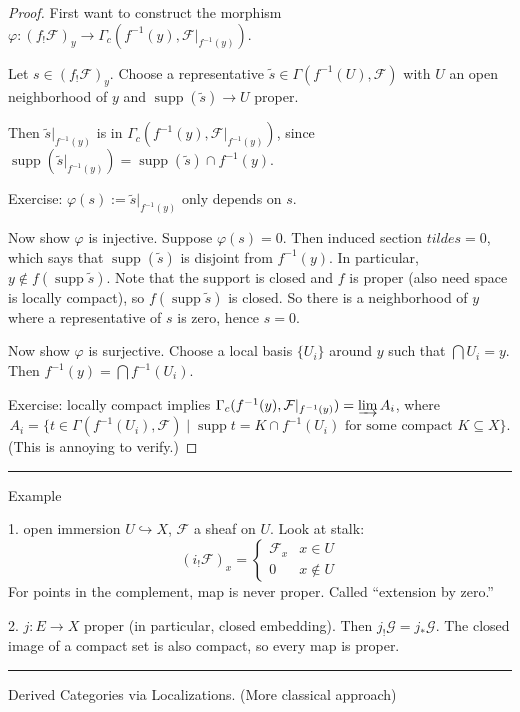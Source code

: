 \documentclass[12pt]{article}
\newcommand{\sepline}{\rule{\textwidth}{0.4pt}}
\theoremstyle{definition}
\newcommand{\FF}{\mathcal{F}}
\newcommand{\GG}{\mathcal{G}}
\renewcommand{\phi}{\varphi}
\newcommand{\<}{\left\langle}
\renewcommand{\>}{\right\rangle}
\newcommand{\seq}{\subseteq}
\newcommand{\inc}{\hookrightarrow}
\DeclareMathOperator{\supp}{supp}
\renewcommand{\_}[1]{{_{#1}}}
\begin{document}
\begin{proof}
    First want to construct the morphism $\phi : (f_!\FF)_y \to \Gamma_c(f^{-1}(y), \FF|_{f^{-1}(y)})$.

    Let $s \in (f_!\FF)_y$.
    Choose a representative $\tilde{s} \in \Gamma(f^{-1}(U), \FF)$ with $U$ an open neighborhood of $y$ and $\supp(\tilde{s}) \to U$ proper.

    Then $\tilde{s}|_{f^{-1}(y)}$ is in $\Gamma_c(f^{-1}(y), \FF|_{f^{-1}(y)})$, since $\supp(\tilde{s}|_{f^{-1}(y)}) = \supp(\tilde{s}) \cap f^{-1}(y)$.

    Exercise: $\phi(s) := \tilde{s}|_{f^{-1}(y)}$ only depends on $s$.

    Now show $\phi$ is injective.
    Suppose $\phi(s) = 0$.
    Then induced section $tilde{s} = 0$, which says that $\supp(\tilde{s})$ is disjoint from $f^{-1}(y)$.
    In particular, $y \notin f(\supp\tilde{s})$.
    Note that the support is closed and $f$ is proper (also need space is locally compact), so $f(\supp\tilde{s})$ is closed.
    So there is a neighborhood of $y$ where a representative of $s$ is zero, hence $s = 0$.

    Now show $\phi$ is surjective.
    Choose a local basis $\{U_i\}$ around $y$ such that $\bigcap U_i = y$.
    Then $f^{-1}(y) = \bigcap f^{-1}(U_i)$.

    Exercise: locally compact implies $\Gamma_c(f^{-1}(y), \FF|_{f^{-1}(y)}) = \varinjlim A_i$, where
    \[
        A_i = \{t \in \Gamma(f^{-1}(U_i), \FF) \mid \supp t = K \cap f^{-1}(U_i) \text{ for some compact } K \seq X\}.
    \]
    (This is annoying to verify.)

    
\end{proof}

\sepline

Example

1. open immersion $U \inc X$, $\FF$ a sheaf on $U$.
Look at stalk:
\[
    (i_!\FF)_x = \begin{cases}
        \FF_x & x \in U \\
        0 & x \notin U
    \end{cases}
\]
For points in the complement, map is never proper.
Called ``extension by zero.''


2. $j : E \to X$ proper (in particular, closed embedding).
Then $j_!\GG = j_*\GG$.
The closed image of a compact set is also compact, so every map is proper.

\sepline

Derived Categories via Localizations.
(More classical approach)
\end{document}
